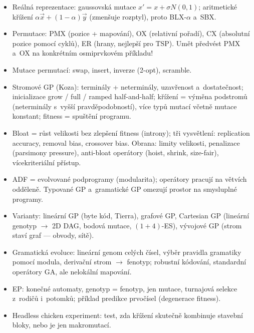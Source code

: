\documentclass[11pt,a4paper]{article}
\theoremstyle{definition}
\begin{document}
\begin{itemize}
 jen nezaujaté mutace, pro ordinální i~zaujaté (creep).
\item Reálná reprezentace: gaussovská mutace $x' = x + \sigma N(0,1)$;
 aritmetické křížení $\alpha \vec x + (1-\alpha)\vec y$ (zmenšuje rozptyl),
 proto BLX-$\alpha$ a~SBX.
\item Permutace: PMX (pozice + mapování), OX (relativní pořadí),
 CX (absolutní pozice pomocí cyklů), ER (hrany, nejlepší pro TSP).
 Umět předvést PMX a~OX na konkrétním osmiprvkovém příkladu!
\item Mutace permutací: swap, insert, inverze (2-opt), scramble.
\item Stromové GP (Koza): terminály + neterminály, uzavřenost a~dostatečnost;
 inicializace grow / full / ramped half-and-half; křížení = výměna podstromů
 (neterminály s~vyšší pravděpodobností), více typů mutací včetně mutace
 konstant; fitness = spuštění programu.
\item Bloat = růst velikosti bez zlepšení fitness (introny); tři vysvětlení:
 replication accuracy, removal bias, crossover bias. Obrana: limity
 velikosti, penalizace (parsimony pressure), anti-bloat operátory
 (hoist, shrink, size-fair), vícekriteriální přístup.
\item ADF = evolvované podprogramy (modularita); operátory pracují na větvích
 odděleně. Typované GP a~gramatické GP omezují prostor na smysluplné programy.
\item Varianty: lineární GP (byte kód, Tierra), grafové GP,
 Cartesian GP (lineární genotyp $\to$ 2D DAG, bodová mutace, $(1+4)$-ES),
 vývojové GP (strom staví graf --- obvody, sítě).
\item Gramatická evoluce: lineární genom celých čísel, výběr pravidla
 gramatiky pomocí modula, derivační strom $\to$ fenotyp; robustní kódování,
 standardní operátory GA, ale nelokální mapování.
\item EP: konečné automaty, genotyp = fenotyp, jen mutace, turnajová selekce
 z~rodičů i~potomků; příklad predikce prvočísel (degenerace fitness).
\item Headless chicken experiment: test, zda křížení skutečně kombinuje
 stavební bloky, nebo je jen makromutací.
\end{itemize}
\end{document}
